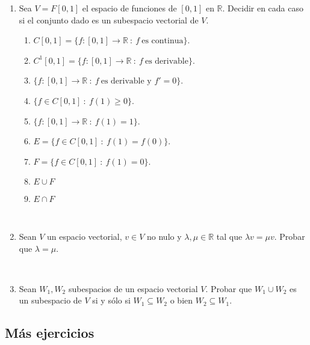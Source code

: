\documentclass[12pt]{amsart}
\begin{document}
\begin{enumerate}
    \item Sea $V= F[0,1]$ el espacio de funciones de $[0,1]$ en $\mathbb{R}$. Decidir en cada caso si el conjunto dado es un subespacio vectorial de $V$.
    \begin{enumerate}
    \item $C[0,1] = \{ f : [0,1] \rightarrow \mathbb{R} \ : \ f \ \text{es continua}\}$.
			\item $C^1[0,1] = \{ f : [0,1] \rightarrow \mathbb{R} \ : \ f \ \text{es  derivable}\}$.
\item $\{ f : [0,1] \rightarrow \mathbb{R} \ : \ f \ \text{es  derivable y }f'=0\}$.
					\item $\{ f \in C[0,1] \ : \ f(1) \geq 0\}$.
			\item $\{ f : [0,1] \rightarrow \mathbb{R} \ : \ f(1) = 1 \}$.
					\item $E=\{f \in C[0,1] \ : \ f(1) = f (0)\}$.
			\item $F=\{f \in C[0,1] \ : \ f(1) = 0\}$.
    \item $E\cup F$
    \item $E\cap F$
\end{enumerate}

\

\item Sean $V$ un espacio vectorial, $v\in V$ no nulo y $\lambda,\mu\in\mathbb{R}$ tal que $\lambda v=\mu v$. Probar que $\lambda=\mu$.

\

	\item Sean $W_1, W_2$ subespacios de un espacio vectorial $V$. Probar que $W_1 \cup W_2$ es un subespacio
	de $V$ si y s\'olo si $W_1 \subseteq W_2$ o bien $W_2 \subseteq W_1$.

\end{enumerate}

\subsection*{M\'as ejercicios}
\end{document}
